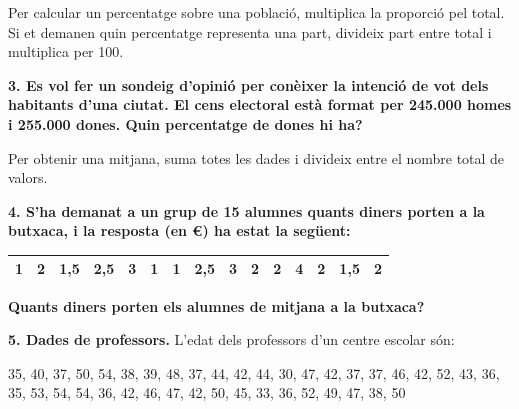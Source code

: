 \documentclass[12pt,a4paper]{article}
\begin{document}
\begin{center}
\end{center}

\begin{capsula}
Per calcular un percentatge sobre una població, multiplica la proporció pel total. Si et demanen quin percentatge representa una part, divideix part entre total i multiplica per 100.
\end{capsula}

\textbf{3. Es vol fer un sondeig d’opinió per conèixer la intenció de vot dels habitants d’una ciutat. El cens electoral està format per 245.000 homes i 255.000 dones. Quin percentatge de dones hi ha?}

\vspace{2.2cm}

\begin{capsula}
Per obtenir una mitjana, suma totes les dades i divideix entre el nombre total de valors.
\end{capsula}

\textbf{4. S’ha demanat a un grup de 15 alumnes quants diners porten a la butxaca, i la resposta (en €) ha estat la següent:}

\begin{center}
\begin{tabular}{|*{15}{c|}}
\hline
1 & 2 & 1,5 & 2,5 & 3 & 1 & 1 & 2,5 & 3 & 2 & 2 & 4 & 2 & 1,5 & 2 \\ \hline
\end{tabular}
\end{center}

\textbf{Quants diners porten els alumnes de mitjana a la butxaca?}

\vspace{2.5cm}

\textbf{5. Dades de professors.} L’edat dels professors d’un centre escolar són:
\begin{center}
35, 40, 37, 50, 54, 38, 39, 48, 37, 44, 42, 44, 30, 47, 42, 37, 37, 46, 42, 52, 43, 36, 35, 53, 54, 54, 36, 42, 46, 47, 42, 50, 45, 33, 36, 52, 49, 47, 38, 50
\end{center}
\end{document}
